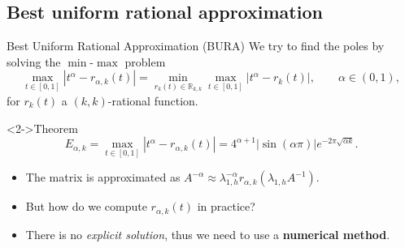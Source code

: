 \documentclass[aspectratio=169,xcolor=dvipsnames]{beamer}
\begin{document}
	\subsection{Best uniform rational approximation}
	
	\begin{frame}{Best Uniform Rational Approximation (BURA)}
	We try to find the poles by solving the $\min$-$\max$ problem
	\[
	\max_{t \in [0,1]} |t^\alpha - r_{\alpha,k}(t)| = \min_{r_k(t) \in \mathbb{R}_{k,k}} \max_{t \in [0,1]} | t^\alpha - r_k(t)|, \qquad \alpha \in (0,1),
	\]
	for $r_k(t)$ a $(k,k)$-rational function.
	
	\begin{alertblock}<2->{Theorem \parencite[Theorem~1]{MR1998350}}
	\[
	E_{\alpha,k} = \max_{t \in [0,1]} |t^\alpha - r_{\alpha,k}(t)| = 4^{\alpha+1} |\sin(\alpha \pi)| e^{-2\pi\sqrt{\alpha k}}.
	\]
	\end{alertblock}
	\begin{itemize}
		\item[\faWrench]<3-> The matrix is approximated as $A^{-\alpha} \approx \lambda_{1,h}^{-\alpha} r_{\alpha,k} (\lambda_{1,h} A^{-1})$.
		\item[\faQuestionCircle]<4-> But how do we compute $r_{\alpha,k}(t)$ in practice?
		\item[\faHammer]<5-> There is no \emph{explicit solution}, thus we need to use a \textbf{numerical method}.
	\end{itemize}
	\end{frame}
\end{document}

